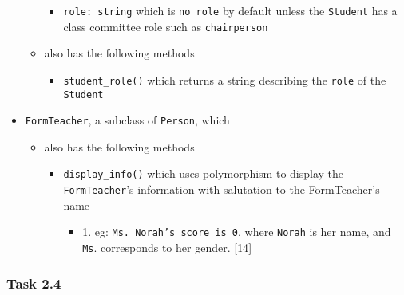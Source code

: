 \begin{itemize}
\begin{itemize}
\begin{itemize}
\item \texttt{role: string} which is \textquotedbl\texttt{no role}\textquotedbl{}
by default unless the \texttt{Student} has a class committee role
such as \textquotedbl\texttt{chairperson}\textquotedbl{} 
\end{itemize}
\item also has the following methods 
\begin{itemize}
\item \texttt{student\_role()} which returns a string describing the \texttt{role}
of the \texttt{Student}
\end{itemize}
\end{itemize}
\item \texttt{FormTeacher}, a subclass of \texttt{Person}, which 
\begin{itemize}
\item also has the following methods
\begin{itemize}
\item \texttt{display\_info()} which uses polymorphism to display the\texttt{
FormTeacher}\textquoteright s information with salutation to the FormTeacher\textquoteright s
name 
\begin{itemize}
\item 1. eg: \textquotedbl\texttt{Ms. Norah's score is 0}.\textquotedbl{}
where \textquotedbl\texttt{Norah}\textquotedbl{} is her name, and
\textquotedbl\texttt{Ms}.\textquotedbl{} corresponds to her gender.
\hfill{} {[}14{]}
\end{itemize}
\end{itemize}
\end{itemize}
\end{itemize}

\subsubsection*{Task 2.4}

